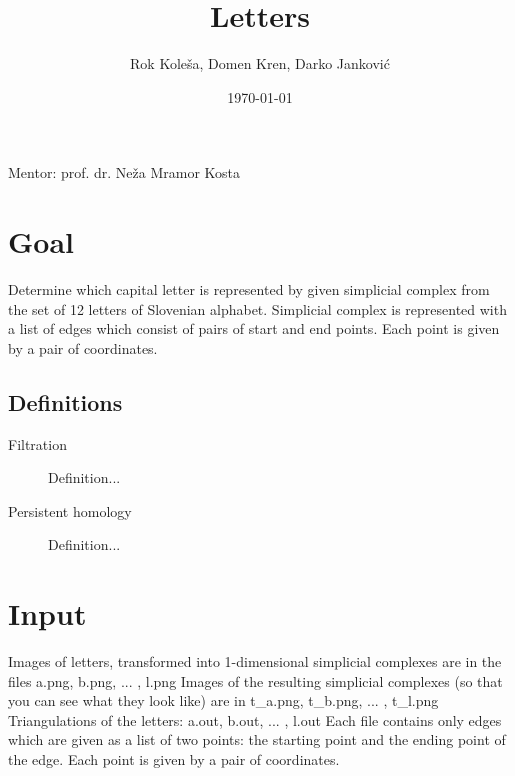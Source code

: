 \documentclass{article}
\title{Letters} %
\author{Rok Koleša, Domen Kren, Darko Janković} %
\date{\today} %
\begin{document}
\maketitle %

\begin{center}
Mentor: prof. dr. Neža Mramor Kosta %
\end{center}


\newpage
\tableofcontents
\newpage

\section{Goal}
  Determine which capital letter is represented by given simplicial complex from the set of 12 letters of Slovenian alphabet. Simplicial complex is represented with a list of edges which consist of pairs of start and end points. Each point is given by a pair of coordinates.


\subsection{Definitions}
\label{definicije}
\begin{description}
\item[Filtration]
Definition...
\item[Persistent homology]
Definition...
\end{description} 
 

\section{Input}
Images of letters, transformed into 1-dimensional simplicial complexes are in the files
a.png, b.png, ... , l.png
Images of the resulting simplicial complexes (so that you can see what they look like) are
in t\_a.png, t\_b.png, ... , t\_l.png
Triangulations of the letters: a.out, b.out, ... , l.out
Each file contains only edges which are given as a list of two points: the starting point
and the ending point of the edge. Each point is given by a pair of coordinates.
\end{document}
